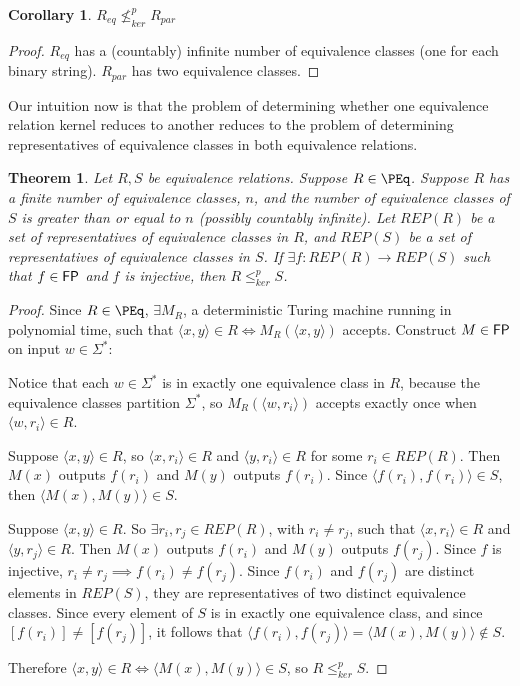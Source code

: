 \documentclass{article}
\newtheorem{theorem}{Theorem}[section]
\newtheorem{corollary}[corollary]{Corollary}
\theoremstyle{definition} \newtheorem{definition}[definition]{Definition}
\newcommand{\sigmastar}{\Sigma^{*}} %
\newcommand{\kr}{\leq^{p}_{ker}} %
\newcommand{\nkr}{\nleq^{p}_{ker}} %
\newcommand{\pair}[2]{\langle#1,#2\rangle} %
\begin{document}
\begin{corollary}
  $R_{eq}\nkr R_{par}$
\end{corollary}
\begin{proof}
  $R_{eq}$ has a (countably) infinite number of equivalence classes (one for
  each binary string). $R_{par}$ has two equivalence classes.
\end{proof}

Our intuition now is that the problem of determining whether one equivalence
relation kernel reduces to another reduces to the problem of determining
representatives of equivalence classes in both equivalence relations.

\begin{theorem}\label{thm:repr_kr}
  Let $R,S$ be equivalence relations. Suppose $R\in\PEq$. Suppose $R$ has a
  finite number of equivalence classes, $n$, and the number of equivalence
  classes of $S$ is greater than or equal to $n$ (possibly countably
  infinite). Let $REP(R)$ be a set of representatives of equivalence classes in
  $R$, and $REP(S)$ be a set of representatives of equivalence classes in $S$.
  If $\exists f\colon REP(R)\to REP(S)$ such that $f\in{\ensuremath{\mathsf{FP}}}$ and $f$ is
  injective, then $R\kr S$.
\end{theorem}
\begin{proof}
  Since $R\in\PEq$, $\exists M_R$, a deterministic Turing machine running in
  polynomial time, such that $\pair{x}{y}\in R\iff M_R(\pair{x}{y})$
  accepts. Construct $M\in{\ensuremath{\mathsf{FP}}}$ on input $w\in\sigmastar$:\\
  \begin{algorithm}[H]
    \For{$r_i\in REP(R)$}{
      \If{$M_R(\pair{w}{r_i})$ accepts}{
        \Return{$f(r_i)$}
      }
    }
  \end{algorithm}
  Notice that each $w\in\sigmastar$ is in exactly one equivalence class in $R$,
  because the equivalence classes partition $\sigmastar$, so
  $M_R(\pair{w}{r_i})$ accepts exactly once when $\pair{w}{r_i}\in R$.

  Suppose $\pair{x}{y}\in R$, so $\pair{x}{r_i}\in R$ and $\pair{y}{r_i}\in R$
  for some $r_i\in REP(R)$. Then $M(x)$ outputs $f(r_i)$ and $M(y)$ outputs
  $f(r_i)$. Since $\pair{f(r_i)}{f(r_i)}\in S$, then $\pair{M(x)}{M(y)}\in S$.

  Suppose $\pair{x}{y}\in R$. So $\exists r_i, r_j\in REP(R)$, with $r_i\neq
  r_j$, such that $\pair{x}{r_i}\in R$ and $\pair{y}{r_j}\in R$. Then $M(x)$
  outputs $f(r_i)$ and $M(y)$ outputs $f(r_j)$. Since $f$ is injective,
  $r_i\neq r_j\implies f(r_i)\neq f(r_j)$. Since $f(r_i)$ and $f(r_j)$ are
  distinct elements in $REP(S)$, they are representatives of two distinct
  equivalence classes. Since every element of $S$ is in exactly one equivalence
  class, and since $[f(r_i)]\neq[f(r_j)]$, it follows that
  $\pair{f(r_i)}{f(r_j)}=\pair{M(x)}{M(y)}\notin S$.

  Therefore $\pair{x}{y}\in R\iff \pair{M(x)}{M(y)}\in S$, so $R\kr S$.
\end{proof}
\end{document}
